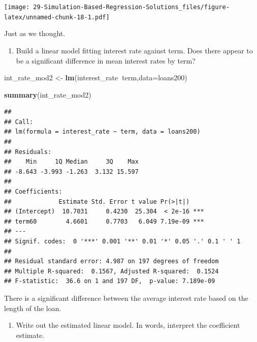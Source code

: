 \documentclass[
]{book}
\newenvironment{Shaded}{\begin{snugshade}}{\end{snugshade}}
\newcommand{\DataTypeTok}[1]{\textcolor[rgb]{0.13,0.29,0.53}{#1}}
\newcommand{\KeywordTok}[1]{\textcolor[rgb]{0.13,0.29,0.53}{\textbf{#1}}}
\newcommand{\NormalTok}[1]{#1}
\newcommand{\OperatorTok}[1]{\textcolor[rgb]{0.81,0.36,0.00}{\textbf{#1}}}
\newcommand{\StringTok}[1]{\textcolor[rgb]{0.31,0.60,0.02}{#1}}
\providecommand{\tightlist}{%
  \setlength{\itemsep}{0pt}\setlength{\parskip}{0pt}}
\begin{document}
\texttt{[image: 29-Simulation-Based-Regression-Solutions\_files/figure-latex/unnamed-chunk-18-1.pdf]}

Just as we thought.

\begin{enumerate}
\def\labelenumi{\alph{enumi}.}
\setcounter{enumi}{1}
\tightlist
\item
  Build a linear model fitting interest rate against term. Does there appear to be a significant difference in mean interest rates by term?
\end{enumerate}

\begin{Shaded}
\begin{Highlighting}[]
\NormalTok{int_rate_mod2 <-}\StringTok{ }\KeywordTok{lm}\NormalTok{(interest_rate}\OperatorTok{~}\NormalTok{term,}\DataTypeTok{data=}\NormalTok{loans200)}
\end{Highlighting}
\end{Shaded}

\begin{Shaded}
\begin{Highlighting}[]
\KeywordTok{summary}\NormalTok{(int_rate_mod2)}
\end{Highlighting}
\end{Shaded}

\begin{verbatim}
## 
## Call:
## lm(formula = interest_rate ~ term, data = loans200)
## 
## Residuals:
##    Min     1Q Median     3Q    Max 
## -8.643 -3.993 -1.263  3.132 15.597 
## 
## Coefficients:
##             Estimate Std. Error t value Pr(>|t|)    
## (Intercept)  10.7031     0.4230  25.304  < 2e-16 ***
## term60        4.6601     0.7703   6.049 7.19e-09 ***
## ---
## Signif. codes:  0 '***' 0.001 '**' 0.01 '*' 0.05 '.' 0.1 ' ' 1
## 
## Residual standard error: 4.987 on 197 degrees of freedom
## Multiple R-squared:  0.1567, Adjusted R-squared:  0.1524 
## F-statistic:  36.6 on 1 and 197 DF,  p-value: 7.189e-09
\end{verbatim}

There is a significant difference between the average interest rate based on the length of the loan.

\begin{enumerate}
\def\labelenumi{\alph{enumi}.}
\setcounter{enumi}{2}
\tightlist
\item
  Write out the estimated linear model. In words, interpret the coefficient estimate.
\end{enumerate}
\end{document}
